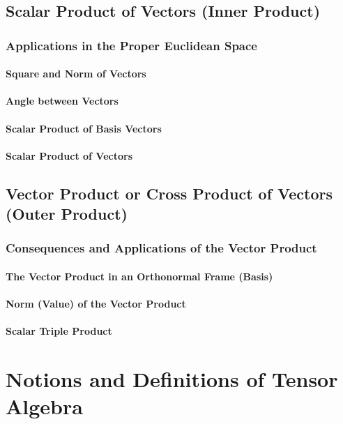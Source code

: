 \documentclass[a5paper,twosided,11pt,DIV=15,BCOR=0mm]{scrbook}
\begin{document}
\subsection{Scalar Product of Vectors (Inner Product)}
%
\begin{remark}

\end{remark}
\subsubsection{Applications in the Proper Euclidean Space}
\paragraph{Square and Norm of Vectors}
\paragraph{Angle between Vectors}
\paragraph{Scalar Product of Basis Vectors}
\paragraph{Scalar Product of Vectors}

\subsection{Vector Product or Cross Product of Vectors (Outer Product)}
\subsubsection{Consequences and Applications of the Vector Product}
\paragraph{The Vector Product in an Orthonormal Frame (Basis)}
\paragraph{Norm (Value) of the Vector Product}
\paragraph{Scalar Triple Product}

\section{Notions and Definitions of Tensor Algebra}
\end{document}

